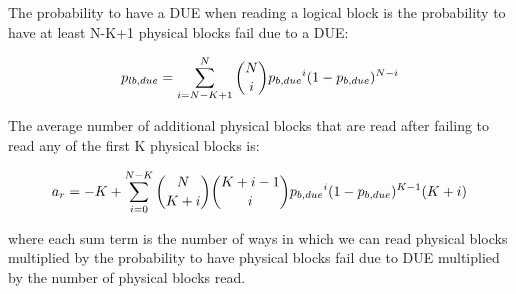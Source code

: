 The probability to have a DUE when reading a logical block is the probability to have at least N-K+1 physical blocks fail due to a DUE:


\begin{equation*}
{p_{lb,due}} = \sum_{i=N-K+1}^{N}\binom{N}{i}{p_{b,due}}^{i}(1-{p_{b,due}})^{N-i}
\end{equation*}


The average number of additional physical blocks that are read after failing to read any of the first K physical blocks is:

\begin{equation*}
a_r= -K + \sum_{i=0}^{N-K} \binom{N}{K+i} \binom{K+i-1}{i}{p_{b,due}}^{i}(1-{p_{b,due}})^{K-1}(K+i)
\end{equation*}

\noindent where each sum term is the number of ways in which we can read physical blocks multiplied by the probability to have physical blocks fail due to DUE multiplied by the number of physical blocks read.